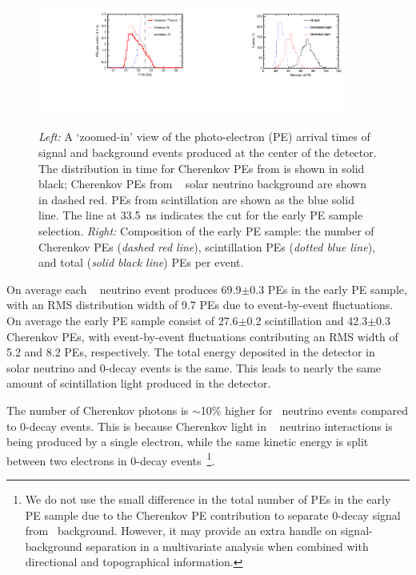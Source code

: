 \begin{figure}[ht]

  \centering
  \includegraphics[width=0.45\textwidth]{hTche_Te130_B8_v2.pdf}
\hfil
  \includegraphics[width=0.45\textwidth]{hMomNPhot_1el_2p529MeV.pdf}
  \caption{\emph{Left:} A `zoomed-in' view of the photo-electron (PE)
   arrival times of signal and background events produced at the
   center of the detector.  The distribution in time for Cherenkov
   PEs from \nbb is shown in solid black; Cherenkov PEs from
   \B~ solar neutrino background are shown in dashed red. PEs from
   scintillation are shown as the blue solid line. The line at 33.5~ns
   indicates the cut for the early PE sample selection.  \emph{Right:}
   Composition of the early PE sample: the number of Cherenkov PEs
   (\emph{dashed red line}), scintillation PEs (\emph{dotted blue
   line}), and total (\emph{solid black line}) PEs per event.}

\label{fig:ArrivalTimeDist_B8}
\end{figure}


On average each \B~ neutrino event produces 69.9$\pm$0.3 PEs in the
early PE sample, with an RMS distribution width of 9.7 PEs due to
event-by-event fluctuations.  On average the early PE sample consist
of 27.6$\pm$0.2 scintillation and 42.3$\pm$0.3 Cherenkov PEs, with
event-by-event fluctuations contributing an RMS width of 5.2 and 8.2
PEs, respectively.  The total energy deposited in the detector in \B~
solar neutrino and 0\nbb-decay events is the same. This leads to
nearly the same amount of scintillation light produced in the
detector.

The number of Cherenkov photons is $\sim$10\% higher for \B~neutrino
events compared to 0\nbb-decay events. This is because Cherenkov light
in \B~ neutrino interactions is being produced by a single electron,
while the same kinetic energy is split between two electrons in
0\nbb-decay events~\footnote{We do not use the small difference in the
total number of PEs in the early PE sample due to the Cherenkov PE
contribution to separate 0\nbb-decay signal from \B~background.
However, it may provide an extra handle on signal-background
separation in a multivariate analysis when combined with directional
and topographical information.}.

